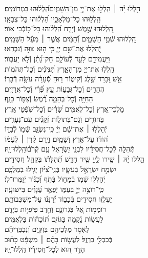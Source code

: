 \documentclass[twoside, openany, parskip=half, 11pt]{book}
\begin{document}
\begin{narrow}
הַ֥לְלוּ יָ֨הּ ׀ \hfill \break
הַֽלְל֣וּ אֶת־יְיָ֭ מִן־הַשָּׁמַ֑יִם\hfill הַֽ֝לְל֗וּהוּ בַּמְּרוֹמִֽים׃ \\
הַֽלְל֥וּהוּ כׇל־מַלְאָכָ֑יו \hfill הַ֝לְל֗וּהוּ כׇּל־צְבָאָֽו׃ \\
הַֽ֭לְלוּהוּ שֶׁ֣מֶשׁ וְֿיָרֵ֑חַ \hfill הַֽ֝לְל֗וּהוּ כׇּל־כּ֥וֹכְֿבֵי אֽוֹר׃ \\
הַֽ֭לְלוּהוּ שְֿׁמֵ֣י הַשָּׁמָ֑יִם \hfill וְֿ֝הַמַּ֗יִם אֲשֶׁ֤ר ׀ מֵעַ֬ל הַשָּׁמָֽיִם׃ \\
יְֽֿ֭הַלְלוּ אֶת־שֵׁ֣ם יְיָ֑ \hfill כִּ֤י ה֖וּא צִוָּ֣ה וְֿנִבְרָֽאוּ׃ \\
וַיַּעֲמִידֵ֣ם לָעַ֣ד לְֿעוֹלָ֑ם \hfill חׇק־נָ֝תַ֗ן וְֿלֹ֣א יַעֲבֽוֹר׃ \\
הַֽלְל֣וּ אֶת־יְיָ֭ מִן־הָאָ֑רֶץ \hfill תַּ֝נִּינִ֗ים וְֿכׇל־תְּהֹמֽוֹת׃ \\
אֵ֣שׁ וּ֭בָרָד שֶׁ֣לֶג וְֿקִיט֑וֹר \hfill ר֥וּחַ סְֿ֝עָרָ֗ה עֹשָׂ֥ה דְֿבָרֽוֹ׃ \\
הֶהָרִ֥ים וְֿכׇל־גְּבָע֑וֹת \hfill עֵ֥ץ פְּֿ֝רִ֗י וְֿכׇל־אֲרָזִֽים׃ \\
הַחַיָּ֥ה וְֿכׇל־בְּהֵמָ֑ה \hfill רֶ֗֝מֶשׂ וְֿצִפּ֥וֹר כָּנָֽף׃ \\
מַלְכֵי־אֶ֭רֶץ וְֿכׇל־לְאֻמִּ֑ים \hfill שָׂ֝רִ֗ים וְֿכׇל־שֹׁ֥פְֿטֵי אָֽרֶץ׃ \\
בַּחוּרִ֥ים וְֿגַם־בְּתוּל֑וֹת \hfill זְֿ֝קֵנִ֗ים עִם־נְעָרִֽים׃ \\
יְֿהַלְל֤וּ ׀ אֶת־שֵׁ֬ם יְיָ֗ \hfill כִּֽי־נִשְׂגָּ֣ב שְֿׁמ֣וֹ לְֿבַדּ֑וֹ\\ ה֝וֹד֗וֹ עַל־אֶ֥רֶץ וְֿשָׁמָֽיִם׃ \hfill
וַיָּ֤רֶם קֶ֨רֶן ׀ לְֿעַמּ֡וֹ\\ תְּֿהִלָּ֤ה לְֽֿכׇל־חֲסִידָ֗יו לִבְנֵ֣י יִ֭שְׂרָאֵל עַ֥ם קְֿרֹב֗וֹ\hfill הַֽלְלוּ־יָֽהּ׃ \\

הַ֥לְלוּ יָ֨הּ ׀ \hfill \break
שִׁ֣ירוּ לַֽייָ֭ שִׁ֣יר חָדָ֑שׁ \hfill תְּֿ֝הִלָּת֗וֹ בִּקְהַ֥ל חֲסִידִֽים׃ \\
יִשְׂמַ֣ח יִשְׂרָאֵ֣ל בְּֿעֹשָׂ֑יו \hfill בְּֿנֵֽי־צִ֝יּ֗וֹן יָגִ֥ילוּ בְֿמַלְכָּֽם׃ \\
יְֿהַלְל֣וּ שְֿׁמ֣וֹ בְֿמָח֑וֹל \hfill בְּֿתֹ֥ף וְֿ֝כִנּ֗וֹר יְֿזַמְּרוּ־לֽוֹ׃ \\
כִּֽי־רוֹצֶ֣ה יְיָ֣ בְּֿעַמּ֑וֹ \hfill יְֿפָאֵ֥ר עֲ֝נָוִ֗ים בִּישׁוּעָֽה׃ \\
יַעְלְז֣וּ חֲסִידִ֣ים בְּֿכָב֑וֹד \hfill יְֿ֝רַנְּנ֗וּ עַל־מִשְׁכְּבוֹתָֽם׃ \\
רוֹמְֿמ֣וֹת אֵ֭ל בִּגְרוֹנָ֑ם \hfill וְֿחֶ֖רֶב פִּיפִיּ֣וֹת בְּֿיָדָֽם׃ \\
לַעֲשׂ֣וֹת נְֿ֭קָמָה בַּגּוֹיִ֑ם \hfill תּ֝וֹכֵח֗וֹת בַּלְאֻמִּֽים׃ \\
לֶאְסֹ֣ר מַלְכֵיהֶ֣ם בְּֿזִקִּ֑ים \hfill וְֿ֝נִכְבְּדֵיהֶ֗ם\\ בְּֿכַבְלֵ֥י בַרְזֶֽל׃ \hfill
לַעֲשׂ֤וֹת בָּהֶ֨ם ׀ מִשְׁפָּ֬ט כָּת֗וּב\\ הָדָ֣ר ה֭וּא לְֿכׇל־חֲסִידָ֗יו \hfill הַֽלְלוּ־יָֽהּ׃ \\



\end{narrow}
\end{document}
